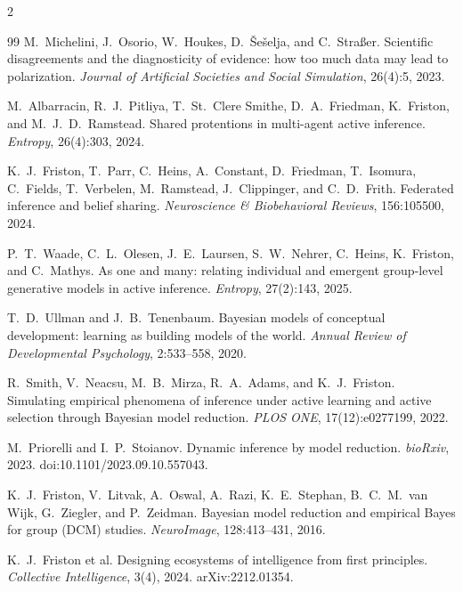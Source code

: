 \documentclass[11pt]{article}
\begin{document}
\begin{multicols}{2}
\begin{thebibliography}{99}
M.~Michelini, J.~Osorio, W.~Houkes, D.~\v{S}e\v{s}elja, and C.~Stra\ss{}er.
Scientific disagreements and the diagnosticity of evidence: how too much data may lead to polarization.
\emph{Journal of Artificial Societies and Social Simulation}, 26(4):5, 2023.

M.~Albarracin, R.~J.~Pitliya, T.~St.~Clere Smithe, D.~A.~Friedman, K.~Friston, and M.~J.~D.~Ramstead.
Shared protentions in multi-agent active inference.
\emph{Entropy}, 26(4):303, 2024.

K.~J.~Friston, T.~Parr, C.~Heins, A.~Constant, D.~Friedman, T.~Isomura, C.~Fields,
T.~Verbelen, M.~Ramstead, J.~Clippinger, and C.~D.~Frith.
Federated inference and belief sharing.
\emph{Neuroscience \& Biobehavioral Reviews}, 156:105500, 2024.

P.~T.~Waade, C.~L.~Olesen, J.~E.~Laursen, S.~W.~Nehrer, C.~Heins, K.~Friston, and C.~Mathys.
As one and many: relating individual and emergent group-level generative models in active inference.
\emph{Entropy}, 27(2):143, 2025.

T.~D.~Ullman and J.~B.~Tenenbaum.
Bayesian models of conceptual development: learning as building models of the world.
\emph{Annual Review of Developmental Psychology}, 2:533--558, 2020.

R.~Smith, V.~Neacsu, M.~B.~Mirza, R.~A.~Adams, and K.~J.~Friston.
Simulating empirical phenomena of inference under active learning and active selection through
{Bayesian} model reduction. \emph{PLOS ONE}, 17(12):e0277199, 2022.

M.~Priorelli and I.~P.~Stoianov.
Dynamic inference by model reduction.
\emph{bioRxiv}, 2023. doi:10.1101/2023.09.10.557043.

K.~J.~Friston, V.~Litvak, A.~Oswal, A.~Razi, K.~E.~Stephan, B.~C.~M.~van Wijk, G.~Ziegler, and
P.~Zeidman. Bayesian model reduction and empirical {Bayes} for group ({DCM}) studies.
\emph{NeuroImage}, 128:413--431, 2016.

K.~J.~Friston et al.
Designing ecosystems of intelligence from first principles.
\emph{Collective Intelligence}, 3(4), 2024. arXiv:2212.01354.


\end{thebibliography}
\end{multicols}
\end{document}
